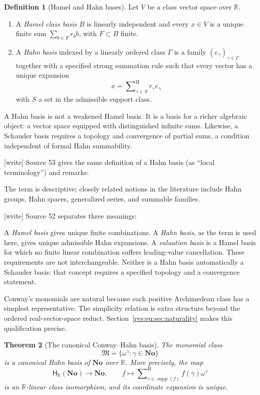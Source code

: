 \documentclass[11pt,letterpaper]{article}
\numberwithin{equation}{section}
\newtheorem{theorem}{Theorem}[section]
\theoremstyle{definition}
\newtheorem{definition}[theorem]{Definition}
\theoremstyle{remark}
\newcommand{\No}{\mathbf{No}}
\newcommand{\R}{\mathbb{R}}
\newcommand{\M}{\mathfrak{M}}
\newcommand{\Hahn}{\mathsf{H}}
\newcommand{\supp}{\operatorname{supp}}
\newcommand{\sH}{\mathop{\sum}\nolimits^{\mathrm H}}
\newcommand{\wtag}{\textup{[write]}}%
\begin{document}
\begin{definition}[Hamel and Hahn bases]
Let \(V\) be a class vector space over \(\R\).
\begin{enumerate}
\item A \emph{Hamel class basis} \(B\) is linearly independent and every
\(x\in V\) is a unique finite sum \(\sum_{b\in F}r_b b\), with \(F\subset B\)
finite.
\item A \emph{Hahn basis} indexed by a linearly ordered class \(\Gamma\) is a
family \((e_\gamma)_{\gamma\in\Gamma}\) together with a specified strong
summation rule such that every vector has a unique expansion
\[
 x=\sH_{\gamma\in S}r_\gamma e_\gamma
\]
with \(S\) a set in the admissible support class.
\end{enumerate}
\end{definition}

A Hahn basis is not a weakened Hamel basis.  It is a basis for a richer
algebraic object: a vector space equipped with distinguished infinite sums.
Likewise, a Schauder basis requires a topology and convergence of partial
sums, a condition independent of formal Hahn summability.

\noindent\wtag{} Source 53 gives the same definition of a Hahn basis (as
``local terminology'') and remarks:

The term is descriptive; closely related notions in the literature include Hahn
groups, Hahn spaces, generalized series, and summable families.

\noindent\wtag{} Source 52 separates three meanings:

A \emph{Hamel basis} gives unique finite combinations. A \emph{Hahn basis}, as the term is used here, gives unique admissible Hahn expansions. A \emph{valuation basis} is a Hamel basis for which no finite linear combination suffers leading-value cancellation. These requirements are not interchangeable. Neither is a Hahn basis automatically a Schauder basis: that concept requires a specified topology and a convergence statement.

Conway's monomials are natural because each positive Archimedean class has a simplest representative. The simplicity relation is extra structure beyond the ordered real-vector-space reduct. Section~\ref{rvs:eu:sec:naturality} makes this qualification precise.
\begin{theorem}[The canonical Conway--Hahn basis]\label{rvs:thm:hahn-basis}
\label{rvs:cv:thm:hahn-basis}
The monomial class
\begin{equation}\label{rvs:eq:monomial-class}
  \M=\{\omega^\gamma:\gamma\in\No\}
\end{equation}
is a canonical Hahn basis of \(\No\) over \(\R\).  More precisely, the map
\[
 \Hahn_{\R}(\No)\longrightarrow\No,
 \qquad
 f\longmapsto\sH_{\gamma\in\supp(f)}f(\gamma)\omega^\gamma
\]
is an \(\R\)-linear class isomorphism, and its coordinate expansion is
unique.
\end{theorem}
\end{document}
